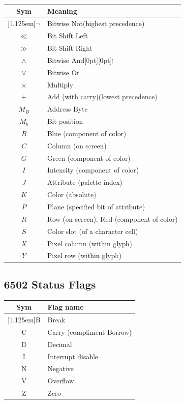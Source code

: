 \documentclass[12pt]{{memoir}}
\begin{document}
\begin{center}\begin{tabular}{cl}
Sym & Meaning \\
\hline
\raisebox{0pt}[1.125em]{$\lnot{}$} & Bitwise Not\hspace{\stretch{1}}(highest precedence) \\
$\ll$ & Bit Shift Left \\
$\gg$ & Bit Shift Right \\
$\wedge$ & Bitwise And\hspace{\stretch{2}}\raisebox{0pt}[0pt][0pt]{$\vdots$}\hspace*{\stretch{1}}\\
$\vee$ & Bitwise Or \\
$\times$ & Multiply \\
$+$ & Add (with carry)\hspace{\stretch{1}}(lowest precedence) \\
$M_B$ & Address Byte \\
$M_b$ & Bit position \\
$B$ & Blue (component of color) \\
$C$ & Column (on screen) \\
$G$ & Green (component of color) \\
$I$ & Intensity (component of color) \\
$J$ & Attribute (palette index) \\
$K$ & Color (absolute) \\
$P$ & Plane (specified bit of attribute) \\
$R$ & Row (on screen), Red (component of color) \\
$S$ & Color slot (of a character cell) \\
$X$ & Pixel column (within glyph) \\
$Y$ & Pixel row (within glyph) \\
\end{tabular}\end{center}

\subsection{6502 Status Flags}

\begin{center}\begin{tabular}{cl}
Sym & Flag name \\
\hline
\raisebox{0pt}[1.125em]{B} & Break \\
C & Carry (compliment Borrow) \\
D & Decimal \\
I & Interrupt disable \\
N & Negative \\
V & Overflow \\
Z & Zero \\
\end{tabular}\end{center}
\end{document}
